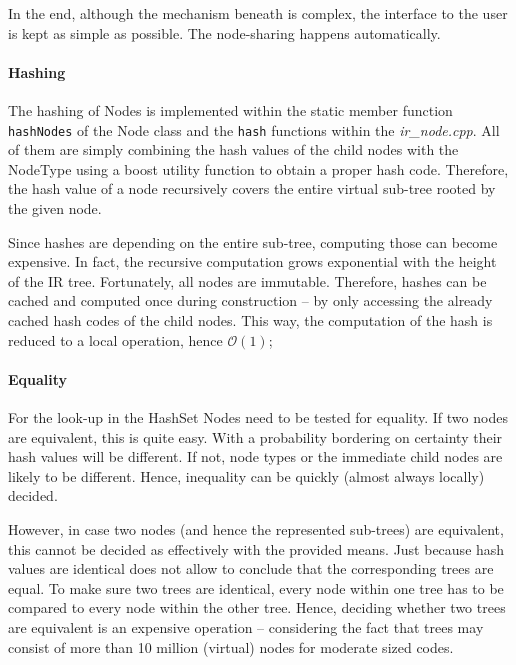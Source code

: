 In the end, although the mechanism beneath is complex, the interface to the user
is kept as simple as possible. The node-sharing happens automatically.

\paragraph{Hashing} 
The hashing of Nodes is implemented within the static member function
\lstinline|hashNodes| of the Node class and the \lstinline|hash| functions
within the \textit{ir\_node.cpp}. All of them are simply combining the hash
values of the child nodes with the NodeType using a boost utility function to
obtain a proper hash code. Therefore, the hash value of a node recursively
covers the entire virtual sub-tree rooted by the given node.

Since hashes are depending on the entire sub-tree, computing those can become
expensive. In fact, the recursive computation grows exponential with the height
of the IR tree. Fortunately, all nodes are immutable. Therefore, hashes can be
cached and computed once during construction -- by only accessing the already
cached hash codes of the child nodes. This way, the computation of the hash is
reduced to a local operation, hence $\mathcal{O}(1)$;

\paragraph{Equality}  
For the look-up in the HashSet Nodes need to be tested for equality. If two
nodes are equivalent, this is quite easy. With a probability bordering on
certainty their hash values will be different. If not, node types or the
immediate child nodes are likely to be different. Hence, inequality can be
quickly (almost always locally) decided.

However, in case two nodes (and hence the represented sub-trees) are equivalent,
this cannot be decided as effectively with the provided means. Just because hash
values are identical does not allow to conclude that the corresponding trees are
equal. To make sure two trees are identical, every node within one tree has to
be compared to every node within the other tree. Hence, deciding whether two
trees are equivalent is an expensive operation -- considering the fact that
trees may consist of more than 10 million (virtual) nodes for moderate sized
codes.

